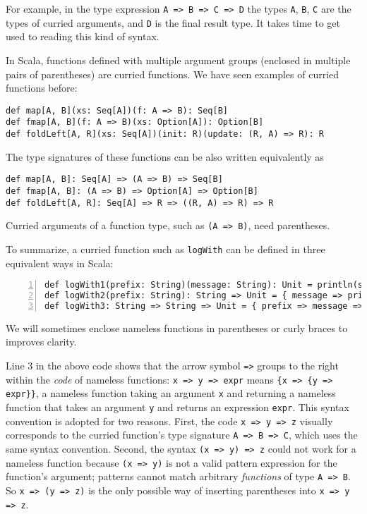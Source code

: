 For example, in the type expression \lstinline!A => B => C => D!
the types \lstinline!A!, \lstinline!B!, \lstinline!C! are the types
of curried arguments, and \lstinline!D! is the final result type.
It takes time to get used to reading this kind of syntax.

In Scala, functions defined with multiple argument groups (enclosed
in multiple pairs of parentheses) are curried functions. We have seen
examples of curried functions before:
\begin{lstlisting}
def map[A, B](xs: Seq[A])(f: A => B): Seq[B]
def fmap[A, B](f: A => B)(xs: Option[A]): Option[B]
def foldLeft[A, R](xs: Seq[A])(init: R)(update: (R, A) => R): R
\end{lstlisting}
The type signatures of these functions can be also written equivalently
as
\begin{lstlisting}
def map[A, B]: Seq[A] => (A => B) => Seq[B]
def fmap[A, B]: (A => B) => Option[A] => Option[B]
def foldLeft[A, R]: Seq[A] => R => ((R, A) => R) => R
\end{lstlisting}
Curried arguments of a function type, such as \lstinline!(A => B)!,
need parentheses.

To summarize, a curried function such as \lstinline!logWith! can
be defined in three equivalent ways in Scala:
\begin{lstlisting}[numbers=left,numberstyle={\small}]
def logWith1(prefix: String)(message: String): Unit = println(s"$prefix: $message")
def logWith2(prefix: String): String => Unit = { message => println(s"$prefix: $message") }
def logWith3: String => String => Unit = { prefix => message => println(s"$prefix: $message") }
\end{lstlisting}
We will sometimes enclose nameless functions in parentheses or curly
braces to improves clarity. 

Line 3 in the above code shows that the arrow symbol \lstinline!=>!
groups to the right within the \emph{code} of nameless functions:
\lstinline!x => y => expr! means \lstinline!{x => {y => expr}}!,
a nameless function taking an argument \lstinline!x! and returning
a nameless function that takes an argument \lstinline!y! and returns
an expression \lstinline!expr!. This syntax convention is adopted
for two reasons. First, the code \lstinline!x => y => z! visually
corresponds to the curried function's type signature \lstinline!A => B => C!,
which uses the same syntax convention. Second, the syntax \lstinline!(x => y) => z!
could not work for a nameless function because \lstinline!(x => y)!
is not a valid pattern expression for the function's argument; patterns
cannot match arbitrary \emph{functions} of type \lstinline!A => B!.
So \lstinline!x => (y => z)! is the only possible way of inserting
parentheses into \lstinline!x => y => z!.

